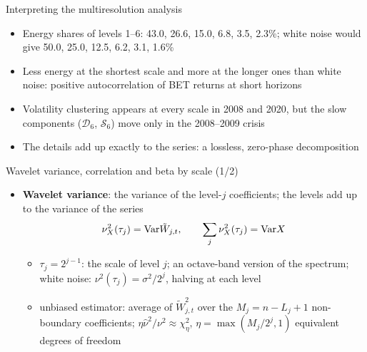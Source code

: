 \begin{frame}{Interpreting the multiresolution analysis}
\itemsize{\small}
\begin{itemize}
    \item Energy shares of levels 1--6: 43.0, 26.6, 15.0, 6.8, 3.5, 2.3\%; white noise would give 50.0, 25.0, 12.5, 6.2, 3.1, 1.6\%
    \item Less energy at the shortest scale and more at the longer ones than white noise: positive autocorrelation of BET returns at short horizons
    \item Volatility clustering appears at every scale in 2008 and 2020, but the slow components ($\mathcal D_6$, $\mathcal S_6$) move only in the 2008--2009 crisis
    \item The details add up exactly to the series: a lossless, zero-phase decomposition
\end{itemize}
\end{frame}

\begin{frame}{Wavelet variance, correlation and beta by scale (1/2)}
\itemsize{\small}
\begin{itemize}
    \item \textbf{Wavelet variance}: the variance of the level-$j$ coefficients; the levels add up to the variance of the series 
    \[ \nu_X^2(\tau_j) = \text{Var}\tilde W_{j,t}, \qquad \sum_j\nu^2_X(\tau_j) = \text{Var} X \]
    \begin{itemize}
        \item $\tau_j = 2^{j-1}$: the scale of level $j$; an octave-band version of the spectrum; white noise: $\nu^2(\tau_j) = \sigma^2/2^j$, halving at each level
        \item unbiased estimator: average of $\tilde W^2_{j,t}$ over the $M_j = n - L_j + 1$ non-boundary coefficients; $\eta\hat\nu^2/\nu^2 \approx \chi^2_\eta$, $\eta = \max(M_j/2^j, 1)$ equivalent degrees of freedom
    \end{itemize}
\end{itemize}
\end{frame}

